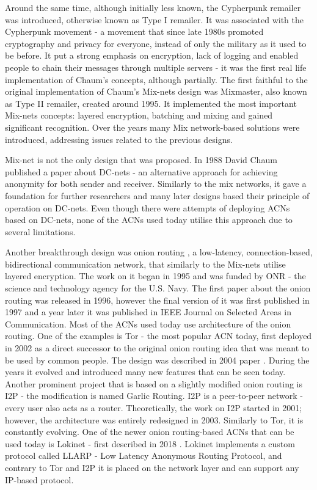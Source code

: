 Around the same time, although initially less known, the Cypherpunk remailer was introduced, otherwise known as Type I remailer. It was associated with the Cypherpunk movement - a movement that since late 1980s promoted cryptography and privacy for everyone, instead of only the military as it used to be before. It put a strong emphasis on encryption, lack of logging and enabled people to chain their messages through multiple servers - it was the first real life implementation of Chaum’s concepts, although partially.
The first faithful to the original implementation of Chaum’s Mix-nets design was Mixmaster, also known as Type II remailer, created around 1995. It implemented the most important Mix-nets concepts: layered encryption, batching and mixing and gained significant recognition. Over the years many Mix network-based solutions were introduced, addressing issues related to the previous designs.

Mix-net is not the only design that was proposed. In 1988 David Chaum published a paper about DC-nets \cite{dc-nets} - an alternative approach for achieving anonymity for both sender and receiver. Similarly to the mix networks, it gave a foundation for further researchers and many later designs based their principle of operation on DC-nets. Even though there were attempts of deploying ACNs based on DC-nets, none of the ACNs used today utilise this approach due to several limitations.

Another breakthrough design was onion routing \cite{onion-routing98, onion-routing-internet99}, a low-latency, connection-based, bidirectional communication network, that similarly to the Mix-nets utilise layered encryption. The work on it began in 1995 and was funded by ONR - the science and technology agency for the U.S. Navy. The first paper about the onion routing was released in 1996, however the final version of it was first published in 1997 and a year later it was published in IEEE Journal on Selected Areas in Communication. Most of the ACNs used today use architecture of the onion routing.
One of the examples is Tor - the most popular ACN today, first deployed in 2002 as a direct successor to the original onion routing idea that was meant to be used by common people. The design was described in 2004 paper \cite{tor-design}. During the years it evolved and introduced many new features that can be seen today.
Another prominent project that is based on a slightly modified onion routing is I2P - the modification is named Garlic Routing. I2P is a peer-to-peer network - every user also acts as a router. Theoretically, the work on I2P started in 2001; however, the architecture was entirely redesigned in 2003. Similarly to Tor, it is constantly evolving.
One of the newer onion routing-based ACNs that can be used today is Lokinet - first described in 2018 \cite{loki}. Lokinet implements a custom protocol called LLARP - Low Latency Anonymous Routing Protocol, and contrary to Tor and I2P it is placed on the network layer and can support any IP-based protocol.

